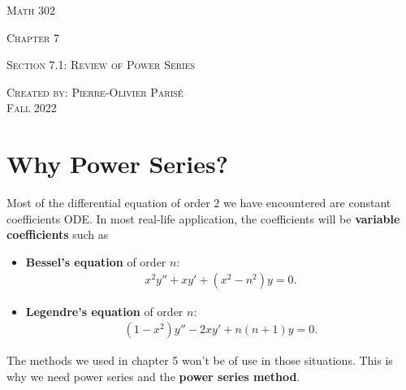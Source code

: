 \documentclass[12pt,a4paper]{article}
\newcounter{example}[section]
\begin{document}
\thispagestyle{empty}

\begin{center}
\vspace*{2.5cm}

{\Huge \textsc{Math 302}}

\vspace*{2cm}

{\LARGE \textsc{Chapter 7}} 

\vspace*{0.75cm}

\noindent\textsc{Section 7.1: Review of Power Series}

\vspace*{0.75cm}

\tableofcontents

\vfill

\noindent \textsc{Created by: Pierre-Olivier Paris{\'e}} \\
\textsc{Fall 2022}
\end{center}

\newpage

\section{Why Power Series?}

Most of the differential equation of order $2$ we have encountered are constant coefficients ODE. In most real-life application, the coefficients will be \textbf{variable coefficients} such as
	\begin{itemize}
	\item \textbf{Bessel's equation} of order $n$:
		\begin{align*}
		x^2 y'' + xy' + (x^2 - n^2) y = 0 .
		\end{align*}
	\item \textbf{Legendre's equation} of order $n$:
		\begin{align*}
		(1 - x^2 ) y'' - 2x y' + n (n + 1) y = 0 .
		\end{align*}
	\end{itemize}
	
The methods we used in chapter 5%
won't be of use in those situations. This is why we need power series and the \textbf{power series method}.

\end{document}
